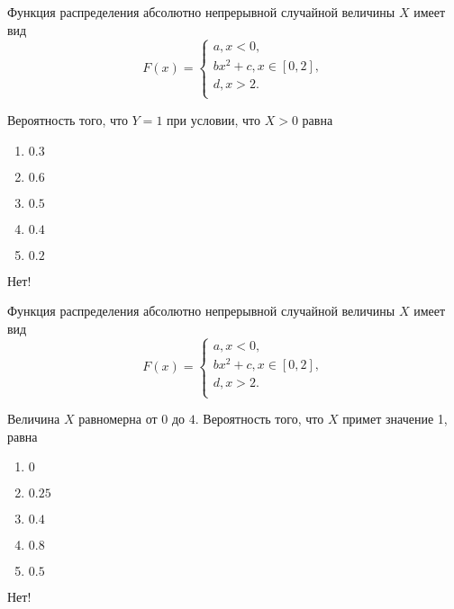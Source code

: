 \documentclass[t]{beamer}
\begin{document}
 \begin{frame} \label{17-No} 
\begin{block}{17} 

Функция распределения абсолютно непрерывной случайной величины $X$ имеет вид
\[
F(x)=\begin{cases}
a, x<0,\\
b x^2+c, x \in [0,2],\\
d, x > 2.\\
\end{cases}
\]
\vspace{0.2cm} 
 
 Вероятность того, что $Y = 1$ при условии, что $X > 0$ равна
 


 \end{block} 
\begin{enumerate} 
\item[] \hyperlink{17-No}{\beamergotobutton{} $0.3$}
\item[] \hyperlink{17-Yes}{\beamergotobutton{} $0.6$}
\item[] \hyperlink{17-No}{\beamergotobutton{} $0.5$}
\item[] \hyperlink{17-No}{\beamergotobutton{} $0.4$
}
\item[] \hyperlink{17-No}{\beamergotobutton{} $0.2$}
\end{enumerate} 

 \alert{Нет!} 
\end{frame} 


 \begin{frame} \label{18-No} 
\begin{block}{18} 

Функция распределения абсолютно непрерывной случайной величины $X$ имеет вид
\[
F(x)=\begin{cases}
a, x<0,\\
b x^2+c, x \in [0,2],\\
d, x > 2.\\
\end{cases}
\]
\vspace{0.2cm} 
 
 Величина $X$ равномерна от $0$ до $4$. Вероятность того, что $X$ примет значение 1, равна
 


 \end{block} 
\begin{enumerate} 
\item[] \hyperlink{18-Yes}{\beamergotobutton{} $0$}
\item[] \hyperlink{18-No}{\beamergotobutton{} $0.25$}
\item[] \hyperlink{18-No}{\beamergotobutton{} $0.4$}
\item[] \hyperlink{18-No}{\beamergotobutton{} $0.8$
}
\item[] \hyperlink{18-No}{\beamergotobutton{} $0.5$}
\end{enumerate} 

 \alert{Нет!} 
\end{frame} 
\end{document}
